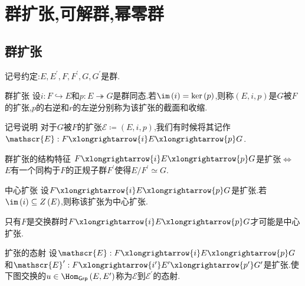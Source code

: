 \chapter{群扩张,可解群,幂零群}

\section{群扩张}

记号约定:$E,E^{\prime},F,F^{\prime},G,G^{\prime}$是群.

\begin{definition}{群扩张}{}
	设$i:F\hookrightarrow E$和$p:E\twoheadrightarrow G$是群同态.若$\im\left(i\right)=\ker\left(p\right)$,则称$\left(E,i,p\right)$是$G$被$F$的扩张,$p$的右逆和$r$的左逆分别称为该扩张的截面和收缩.
\end{definition}

\begin{remark}{记号说明}{}
	对于$G$被$F$的扩张$\mathscr{E}\coloneq\left(E,i,p\right)$,我们有时候将其记作$\mathscr{E}:F\xlongrightarrow{i}E\xlongrightarrow{p}G$.
\end{remark}

\begin{theorem}{群扩张的结构特征}{}
	$F\xlongrightarrow{i}E\xlongrightarrow{p}G$是扩张$\iff$ $E$有一个同构于$F$的正规子群$F^{\prime}$使得$E/F^{\prime}\simeq G$.
\end{theorem}

\begin{definition}{中心扩张}{}
	设$F\xlongrightarrow{i}E\xlongrightarrow{p}G$是扩张.若$\im\left(i\right)\subseteq Z\left(E\right)$,则称该扩张为中心扩张.
\end{definition}

\begin{remark}{}{}
	只有$F$是交换群时$F\xlongrightarrow{i}E\xlongrightarrow{p}G$才可能是中心扩张.
\end{remark}

\begin{definition}{扩张的态射}{}
	设$\mathscr{E}:F\xlongrightarrow{i}E\xlongrightarrow{p}G$和$\mathscr{E}^{\prime}:F\xlongrightarrow{i^{\prime}}E^{\prime}\xlongrightarrow{p^{\prime}}G^{\prime}$是扩张.使下图交换的$u\in\Hom_{\mathsf{Grp}}\left(E,E^{\prime}\right)$称为$\mathscr{E}$到$\mathscr{E}^{\prime}$的态射.
	\begin{center}
	\end{center}
\end{definition}

